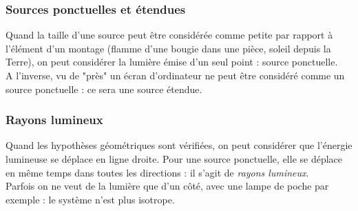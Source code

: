 \documentclass	[11pt, a4paper, openany]{book}
\begin{document}
\subsubsection*{Sources ponctuelles et étendues}
Quand la taille d'une source peut être considérée comme petite par rapport à l’élément d'un montage (flamme d'une bougie dans une pièce, soleil depuis la Terre), on peut considérer la lumière émise d'un seul point : source ponctuelle.\\
A l'inverse, vu de "près" un écran d'ordinateur ne peut être considéré comme un source ponctuelle : ce sera une source étendue.

\subsubsection*{Rayons lumineux}
Quand les  hypothèses géométriques sont vérifiées, on peut considérer que l'énergie lumineuse se déplace en ligne droite. Pour une source ponctuelle, elle se déplace en même temps dans toutes les directions : il s'agit de \textit{rayons lumineux}.\\
Parfois on ne veut de la lumière que d'un côté, avec une lampe de poche par exemple : le système n'est plus isotrope.
\end{document}
